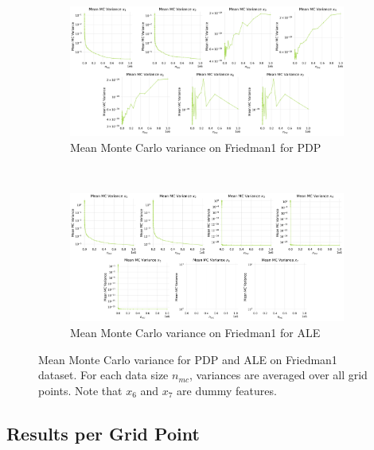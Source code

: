 \documentclass[runningheads]{llncs}
\begin{document}
\begin{figure}[h!]
    \centering
    \begin{subfigure}[b]{\textwidth}
        \centering
        \includegraphics[width=\textwidth]{img/Friedman1-all/mean_mc_variance_pdp.png}
        \caption{Mean Monte Carlo variance on Friedman1 for PDP}
    \end{subfigure}
    \\[10pt]
    \vfill
    \begin{subfigure}[b]{\textwidth}
        \centering
        \includegraphics[width=\textwidth]{img/Friedman1-all/mean_mc_variance_ale.png}
        \caption{Mean Monte Carlo variance on Friedman1 for ALE}
    \end{subfigure}
    \caption{Mean Monte Carlo variance for PDP and ALE on Friedman1 dataset.
        For each data size $n_{mc}$, variances are averaged over all grid points.
        Note that $x_6$ and $x_7$ are dummy features.}
    \label{fig:mean-mc-variance-friedman1}  %
\end{figure}

\clearpage
\subsection{Results per Grid Point}
\end{document}

